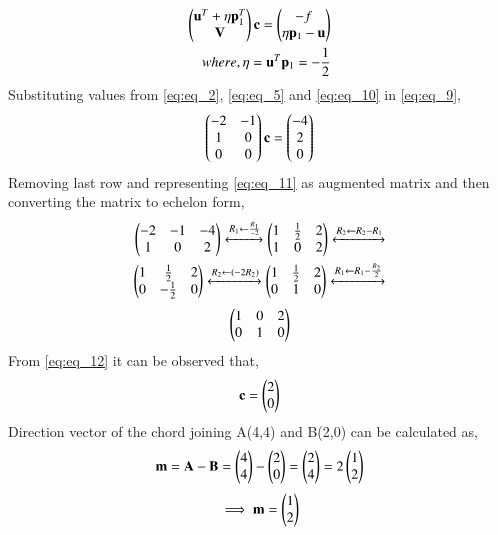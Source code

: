 \documentclass[journal,12pt,twocolumn]{IEEEtran}
\begin{document}
\begin{align}
    \begin{pmatrix}\mathbf{u}^T+\eta \mathbf{p}_1^T \\ \mathbf{V}\end{pmatrix}\mathbf{c} = \begin{pmatrix}-f \\ \eta \mathbf{p}_1-\mathbf{u}\end{pmatrix} \label{eq:eq_9} \\
    where, \eta = \mathbf{u}^T\mathbf{p}_1 = -\frac{1}{2} \label{eq:eq_10}
\end{align}
Substituting values from \eqref{eq:eq_2}, \eqref{eq:eq_5} and \eqref{eq:eq_10} in \eqref{eq:eq_9}, 
\begin{align}
    \begin{pmatrix}-2 & -1 \\ 1 & 0 \\ 0 & 0\end{pmatrix}\mathbf{c}=\begin{pmatrix}-4 \\ 2 \\ 0\end{pmatrix} \label{eq:eq_11}
\end{align}
Removing last row and representing \eqref{eq:eq_11} as augmented matrix and then converting the matrix to echelon form,
\begin{align}
    \begin{pmatrix}-2 & -1 & -4 \\ 1 & 0 & 2\end{pmatrix} \xleftrightarrow[]{R_1\leftarrow\frac{R_1}{-2}} \begin{pmatrix}1 & \frac{1}{2} & 2 \\ 1 & 0 & 2\end{pmatrix} \xleftrightarrow[]{R_2\leftarrow R_2-R_1} \nonumber \\
    \begin{pmatrix}1 & \frac{1}{2} & 2 \\ 0 & -\frac{1}{2} & 0\end{pmatrix} \xleftrightarrow[]{R_2\leftarrow(-2R_2)} \begin{pmatrix}1 & \frac{1}{2} & 2 \\ 0 & 1 & 0\end{pmatrix} \xleftrightarrow[]{R_1\leftarrow R_1-\frac{R_2}{2}} \nonumber
\end{align}
\begin{align}
    \begin{pmatrix}1 & 0 & 2 \\ 0 & 1 & 0\end{pmatrix} \label{eq:eq_12}
\end{align}
From \eqref{eq:eq_12} it can be observed that,
\begin{align}
    \mathbf{c} = \begin{pmatrix}2 \\ 0\end{pmatrix} \label{eq:eq_13}
\end{align}
Direction vector of the chord joining A(4,4) and B(2,0) can be calculated as,
\begin{align}
    \mathbf{m} = \mathbf{A} - \mathbf{B} = \begin{pmatrix}4 \\ 4\end{pmatrix} - \begin{pmatrix}2 \\ 0\end{pmatrix} = \begin{pmatrix}2 \\ 4\end{pmatrix} = 2\begin{pmatrix}1 \\ 2\end{pmatrix} \nonumber
\end{align}
\begin{align}
    \implies \mathbf{m} = \begin{pmatrix}1 \\ 2\end{pmatrix} \label{eq:eq_14}
\end{align}
\end{document}
